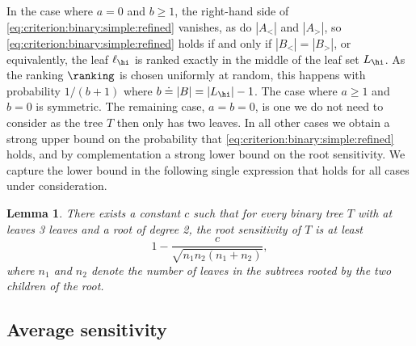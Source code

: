 \documentclass[11pt]{article}
\numberwithin{equation}{section}
\newtheorem{lemma}[theorem]{Lemma}
\theoremstyle{definition}
\theoremstyle{plain}
\begin{document}
In the case where $a = 0$ and $b \ge 1$, the right-hand side of
\eqref{eq:criterion:binary:simple:refined} vanishes, as do $|A_<|$ and $|A_>|$, so \eqref{eq:criterion:binary:simple:refined} holds if and only if $|B_<| = |B_>|$, or equivalently, the leaf $\ell_\hi$ is ranked exactly in the middle of the leaf set $L_\hi$. As the ranking $\ranking$ is chosen uniformly at random, this happens with probability $1/(b+1)$ where $b \doteq |B| = |L_\hi|-1$. The case where $a \ge 1$ and $b=0$ is symmetric. The remaining case, $a=b=0$, is one we do not need to consider as the tree $T$ then only has two leaves. In all other cases we obtain a strong upper bound on the probability that \eqref{eq:criterion:binary:simple:refined} holds, and by complementation a strong lower bound on the root sensitivity. We capture the lower bound in the following single expression that holds for all cases under consideration.
\begin{lemma}\label{lemma:sensitivity:root}
There exists a constant $c$ such that for every binary tree $T$ with at leaves 3 leaves and a root of degree 2, the root sensitivity of $T$ is at least 
\begin{equation}\label{eq:root:bound}
1 - \frac{c}{\sqrt{n_1 n_2 (n_1+n_2)}},
\end{equation}
where $n_1$ and $n_2$ denote the number of leaves in the subtrees rooted by the two children of the root.
\end{lemma}

\subsection{Average sensitivity}
\label{sec:sensitivity:average}
\end{document}
